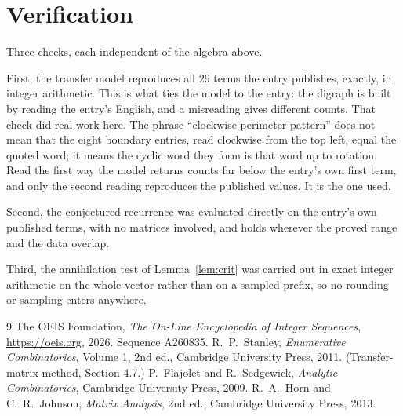 \documentclass[11pt,a4paper]{article}
\theoremstyle{plain}
\theoremstyle{definition}
\begin{document}
\section{Verification}

Three checks, each independent of the algebra above.

First, the transfer model reproduces all $29$ terms the entry publishes, exactly, in
integer arithmetic. This is what ties the model to the entry: the digraph is built by reading
the entry's English, and a misreading gives different counts. That check did real work here. The phrase ``clockwise perimeter pattern'' does not mean that the eight boundary entries, read clockwise from the top left, equal the quoted word; it means the cyclic word they form is that word up to rotation. Read the first way the model returns counts far below the entry's own first term, and only the second reading reproduces the published values. It is the one used.

Second, the conjectured recurrence was evaluated directly on the entry's own published terms,
with no matrices involved, and holds wherever the proved range and the data overlap.

Third, the annihilation test of Lemma~\ref{lem:crit} was carried out in exact integer
arithmetic on the whole vector rather than on a sampled prefix, so no rounding or sampling
enters anywhere.

\begin{thebibliography}{9}
 The OEIS Foundation, \emph{The On-Line Encyclopedia of Integer
Sequences}, \url{https://oeis.org}, 2026. Sequence A260835.
 R.~P.~Stanley, \emph{Enumerative Combinatorics}, Volume 1, 2nd ed.,
Cambridge University Press, 2011. (Transfer-matrix method, Section 4.7.)
 P.~Flajolet and R.~Sedgewick, \emph{Analytic Combinatorics}, Cambridge
University Press, 2009.
 R.~A.~Horn and C.~R.~Johnson, \emph{Matrix Analysis}, 2nd ed., Cambridge
University Press, 2013.
\end{thebibliography}
\end{document}
